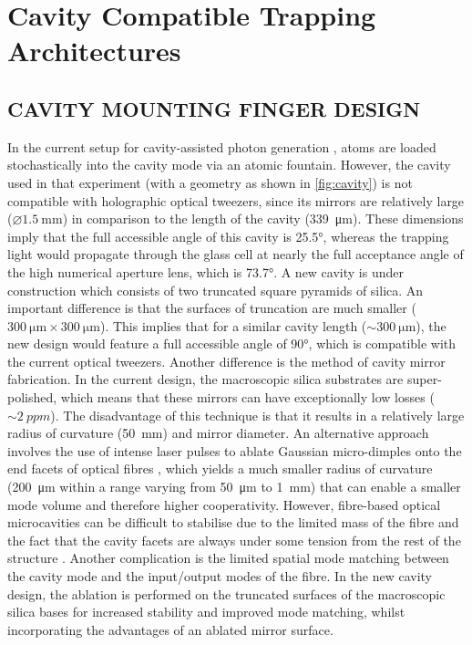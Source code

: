 \documentclass[../Thesis-IJspeert.tex]{subfiles}
\begin{document}
\graphicspath{ {"Cavity Compatible Trapping Architectures/figs/"} }

\chapter{Cavity Compatible Trapping Architectures}
\label{chap:CavityCompatibleTrappingArchitectures}

\section{CAVITY MOUNTING FINGER DESIGN}
In the current setup for cavity-assisted photon generation \cite{Barrett2019}, atoms are loaded stochastically into the cavity mode via an atomic fountain. However, the cavity used in that experiment (with a geometry as shown in \autoref{fig:cavity}) is not compatible with holographic optical tweezers, since its mirrors are relatively large ($\diameter \SI{1.5}{\milli\meter}$) in comparison to the length of the cavity (\SI{339}{\micro\meter}). These dimensions imply that the full accessible angle of this cavity is \ang{25.5}, whereas the trapping light would propagate through the glass cell at nearly the full acceptance angle of the high numerical aperture lens, which is \ang{73.7}. A new cavity is under construction which consists of two truncated square pyramids of silica. An important difference is that the surfaces of truncation are much smaller ($\SI{300}{\micro\meter}\times\SI{300}{\micro\meter}$). This implies that for a similar cavity length ($\sim\SI{300}{\micro\meter}$), the new design would feature a full accessible angle of \ang{90}, which is compatible with the current optical tweezers. Another difference is the method of cavity mirror fabrication. In the current design, the macroscopic silica substrates are super-polished, which means that these mirrors can have exceptionally low losses ($\sim\SI{2}{ppm}$). The disadvantage of this technique is that it results in a relatively large radius of curvature (\SI{50}{\milli\meter}) and mirror diameter. An alternative approach involves the use of intense  laser pulses to ablate Gaussian micro-dimples onto the end facets of optical fibres \cite{Hunger2010}, which yields a much smaller radius of curvature (\SI{200}{\micro\meter} within a range varying from \SI{50}{\micro\meter} to \SI{1}{\milli\meter}) that can enable a smaller mode volume and therefore higher cooperativity. However, fibre-based optical microcavities can be difficult to stabilise due to the limited mass of the fibre and the fact that the cavity facets are always under some tension from the rest of the structure \cite{Janitz2017}. Another complication is the limited spatial mode matching between the cavity mode and the input/output modes of the fibre. In the new cavity design, the ablation is performed on the truncated surfaces of the macroscopic silica bases for increased stability and improved mode matching, whilst incorporating the advantages of an ablated mirror surface.
\end{document}
